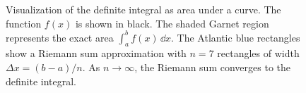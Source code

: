 \begin{figure}[htbp]
\caption{Visualization of the definite integral as area under a curve. The function $f(x)$ is shown in black. The shaded Garnet region represents the exact area $\int_a^b f(x)\,\dd x$. The Atlantic blue rectangles show a Riemann sum approximation with $n=7$ rectangles of width $\Delta x = (b-a)/n$. As $n \to \infty$, the Riemann sum converges to the definite integral.}
\label{fig:integral_area}
\end{figure}
